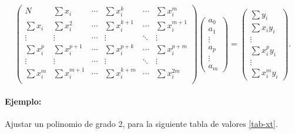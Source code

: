 \documentclass[letterpaper,11pt]{report}
\begin{document}
\begin{equation}
\left(\begin{array}{cccccc}
N & \sum x_i & \cdots &  \sum x_i^k & \cdots & \sum x_i^m \\
\sum x_i &  \sum x_i^2 & \cdots &  \sum x_i^{k+1} & \cdots & \sum x_i^{m+1} \\
\vdots & \vdots & \cdots & \vdots & \ddots & \vdots \\
\sum x^p_i &  \sum x_i^{p+1} & \cdots &  \sum x_i^{p+k} & \cdots & \sum x_i^{p+m} \\
\vdots & \vdots & \cdots & \vdots & \ddots & \vdots \\
\sum x_i^m &  \sum x_i^{m+1} & \cdots &  \sum x_i^{k+m} & \cdots & \sum x_i^{2m} \\
\end{array}
\right)\left(\begin{array}{c}a_0\\a_1\\ \vdots\\a_p\\ \vdots\\a_m\end{array}\right)
=\left(\begin{array}{c}
\sum y_i\\ \sum x_iy_i\\ \vdots\\ \sum x_i^py_i\\ \vdots\\ \sum x_i^m y_i\end{array}\right).
\end{equation}


\paragraph{Ejemplo:}  Ajustar un polinomio de grado 2, para la siguiente tabla de valores \ref{tab-xt}.
\end{document}
